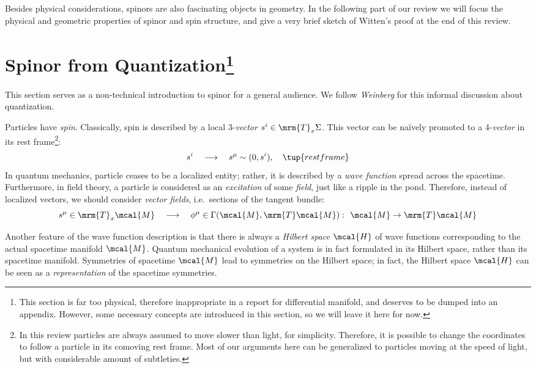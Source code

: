 \documentclass[a4paper,11pt]{article}
\begin{document}
	Besides physical considerations, spinors are also fascinating objects in geometry. In the following part of our review we will focus the physical and geometric properties of spinor and spin structure, and give a very brief sketch of Witten's proof at the end of this review. 
\section[Spinor from Quantization]{%
Spinor from Quantization\footnote{%
	This section is far too physical, therefore inappropriate in a report for differential manifold, and deserves to be dumped into an appendix. However, some necessary concepts are introduced in this section, so we will leave it here for now. 
}}
	This section serves as a non-technical introduction to spinor for a general audience. We follow \textit{Weinberg} \cite{Weinberg:1995mt} for this informal discussion about quantization. 
	
	Particles have \textit{spin}. Classically, spin is described by a local 3-\textit{vector} $s^i \in \mrm{T}_x \Sigma$. This vector can be na\"ively promoted to a 4-\textit{vector} in its rest frame\footnote{
		In this review particles are always assumed to move slower than light, for simplicity. Therefore, it is possible to change the coordinates to follow a particle in its comoving rest frame. Most of our arguments here can be generalized to particles moving at the speed of light, but with considerable amount of subtleties.
	}:
	\begin{equation}
		s^i
		\quad\longrightarrow\quad
		s^\mu \sim (0, s^i),\quad
		\tup{rest frame}
	\end{equation}
	In quantum mechanics, particle ceases to be a localized entity; rather, it is described by a \textit{wave function} spread across the spacetime. Furthermore, in field theory, a particle is considered as an \textit{excitation} of some \textit{field}, just like a ripple in the pond. Therefore, instead of localized vectors, we should consider \textit{vector fields}, i.e.~sections of the tangent bundle:
	\begin{equation}
		s^\mu \in \mrm{T}_x\mcal{M}
		\quad\longrightarrow\quad
		\phi^\mu
		\in \Gamma(\mcal{M},\mrm{T}\mcal{M})
		\,\colon\ 
		\mcal{M}\to\mrm{T}\mcal{M}
		\label{eq:vector_bundle}
	\end{equation}
	
	Another feature of the wave function description is that there is always a \textit{Hilbert space} $\mcal{H}$ of wave functions corresponding to the actual spacetime manifold $\mcal{M}$. Quantum mechanical evolution of a system is in fact formulated in its Hilbert space, rather than its spacetime manifold. Symmetries of spacetime $\mcal{M}$ lead to symmetries on the Hilbert space; in fact, the Hilbert space $\mcal{H}$ can be seen as a \textit{representation} of the spacetime symmetries. 
	
\end{document}

